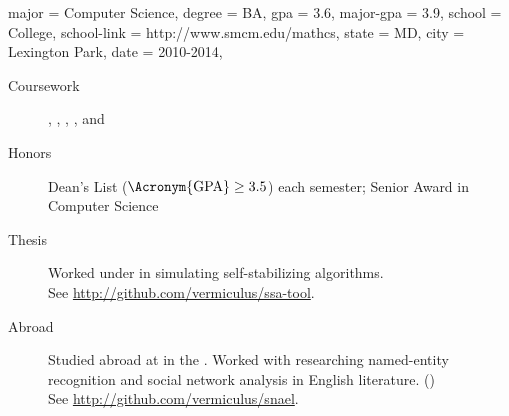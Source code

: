 \begin{education}
  {
    major = Computer Science,
    degree = BA,
    gpa = 3.6,
    major-gpa = 3.9,
    school = \StMarys College,
    school-link = http://www.smcm.edu/mathcs,
    state = MD,
    city = Lexington Park,
    date = 2010-2014,
  }

\begin{description}
\item[Coursework]
  ,
  ,
  ,
  ,
  and
\item[Honors] Dean's List ($\text{\Acronym{GPA}} \geq 3.5$) each semester;
  Senior Award in Computer Science
\item[Thesis] Worked under  in simulating
  self-stabilizing algorithms.
  \\
  See \url{http://github.com/vermiculus/ssa-tool}.
\item[Abroad] Studied abroad at \href{http://www.ucd.ie}{} in the .
  Worked with  researching named-entity recognition and social network
  analysis in English literature. ()
  \\
  See \url{http://github.com/vermiculus/snael}.
\end{description}
\end{education}
